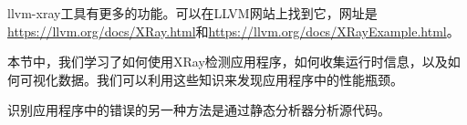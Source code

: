 \begin{tcolorbox}[colback=blue!5!white,colframe=blue!75!black, title=Tip]
llvm-xray工具有更多的功能。可以在LLVM网站上找到它，网址是\url{https://llvm.org/docs/XRay.html}和\url{https://llvm.org/docs/XRayExample.html}。
\end{tcolorbox}

本节中，我们学习了如何使用XRay检测应用程序，如何收集运行时信息，以及如何可视化数据。我们可以利用这些知识来发现应用程序中的性能瓶颈。\par

识别应用程序中的错误的另一种方法是通过静态分析器分析源代码。\par
















